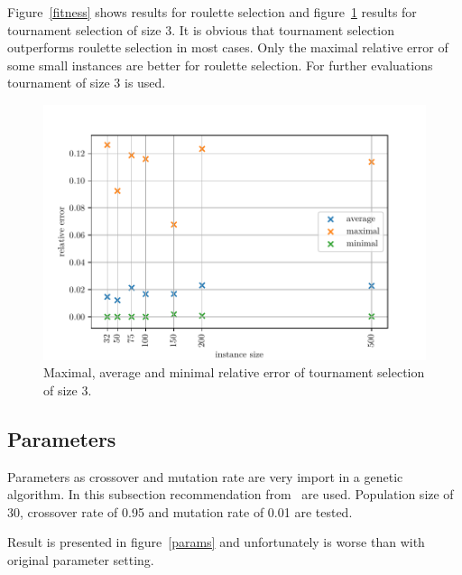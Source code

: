 \documentclass{article}
\begin{document}
Figure~\ref{fitness} shows results for roulette selection
and figure~\ref{tournament} results for tournament selection of size 3.
It is obvious that tournament selection outperforms roulette selection in
most cases.
Only the maximal relative error of some small instances are better for
roulette selection.
For further evaluations tournament of size 3 is used.

\begin{figure}[ht]
\vskip 0.2in
\begin{center}
\centerline{\includegraphics[width=\columnwidth]{figs/tournament}}
\caption{Maximal, average and minimal relative error of tournament selection
of size 3.}
\label{tournament}
\end{center}
\vskip -0.2in
\end{figure}

\subsection{Parameters}

Parameters as crossover and mutation rate are very import in a genetic
algorithm.
In this subsection recommendation from~\cite{schaffer1989} are used.
Population size of 30, crossover rate of 0.95 and mutation rate of 0.01
are tested.

Result is presented in figure~\ref{params}
and unfortunately is worse than with original parameter setting.
\end{document}

